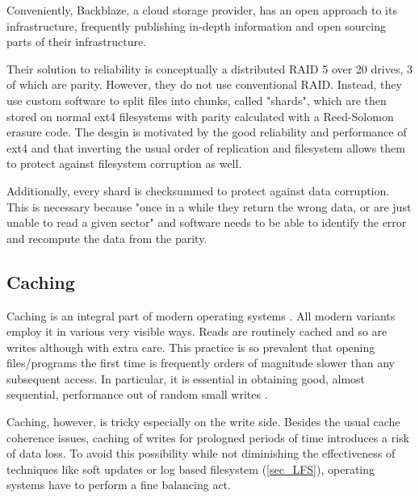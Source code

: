             Conveniently, Backblaze, a cloud storage provider, has an open
            approach to its infrastructure, frequently publishing in-depth
            information and open sourcing parts of their infrastructure.

            Their solution to reliability \cite{Backblaze_arch} is conceptually
            a distributed RAID 5 over 20 drives, 3 of which are parity.
            However, they do not use conventional RAID.  Instead, they use
            custom software to split files into chunks, called "shards", which
            are then stored on normal ext4 filesystems with parity calculated
            with a Reed-Solomon erasure code. The desgin is motivated by the
            good reliability and performance of ext4 and that inverting the
            usual order of replication and filesystem allows them to protect
            against filesystem corruption as well.

            Additionally, every shard is checksummed to protect against data
            corruption. This is necessary because "once in a while they return
            the wrong data, or are just unable to read a given sector"
            \cite{Backblaze_arch} and software needs to be able to identify the
            error and recompute the data from the parity.


        \subsection{Caching}

            Caching is an integral part of modern operating systems
            \cite{IO_bottleneck} \cite{LFS} \cite{LFS} \cite{FFS}. All modern
            variants employ it in various very visible ways. Reads are
            routinely cached and so are writes although with extra care. This
            practice is so prevalent that opening files/programs the first time
            is frequently orders of magnitude slower than any subsequent
            access. In particular, it is essential in obtaining good, almost
            sequential, performance out of random small writes
            \cite{soft_updates} \cite{LFS}.

            Caching, however, is tricky especially on the write side. Besides
            the usual cache coherence issues, caching of writes for prologned
            periods of time introduces a risk of data loss. To avoid this
            possibility while not diminishing the effectiveness of techniques
            like soft updates \cite{soft_updates} or log based filesystem
            (\ref{sec_LFS}), operating systems have to perform a fine balancing
            act.

